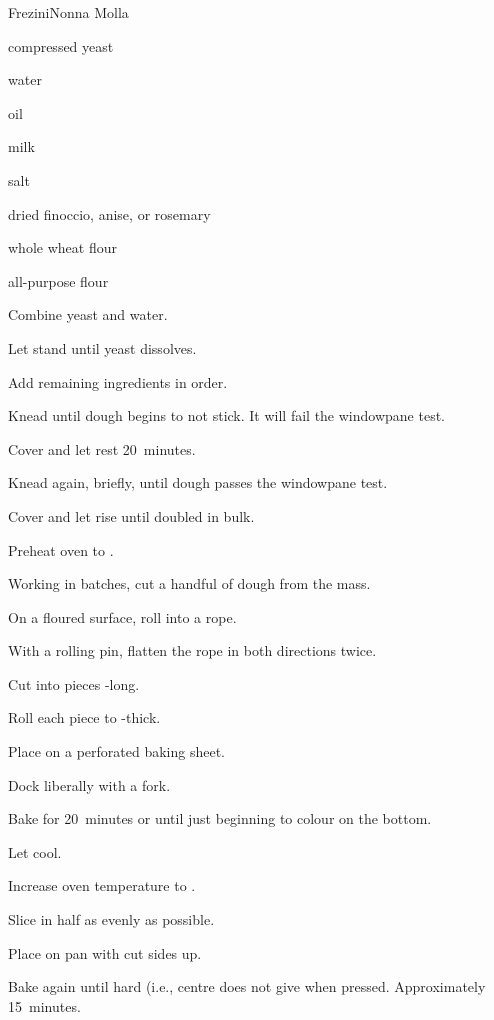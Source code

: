 \begin{recipe}{Frezini}{Nonna Molla}{}

\begin{ingredients}
\item {} compressed yeast
\item {} water
\item {} oil
\item {} milk
\item {} salt
\item \tp{\half} dried finoccio, anise, or rosemary
\item {} whole wheat flour
\item {} all-purpose flour
\end{ingredients}

\begin{directions}
\item Combine yeast and water.
\item Let stand until yeast dissolves.
\item Add remaining ingredients in order.
\item Knead until dough begins to not stick. It will fail the windowpane test.
\item Cover and let rest 20~minutes.
\item Knead again, briefly, until dough passes the windowpane test.
\item Cover and let rise until doubled in bulk.
\item Preheat oven to .
\item Working in batches, cut a handful of dough from the mass.
\item On a floured surface, roll into a rope.
\item With a rolling pin, flatten the rope in both directions twice.
\item Cut into pieces -long.
\item Roll each piece to \inch{\quarter}-thick.
\item Place on a perforated baking sheet.
\item Dock liberally with a fork.
\item Bake for 20~minutes or until just beginning to colour on the bottom.
\item Let cool.
\item Increase oven temperature to .
\item Slice in half as evenly as possible.
\item Place on pan with cut sides up.
\item Bake again until hard (i.e., centre does not give when pressed. Approximately 15~minutes.
\end{directions}

\end{recipe}
